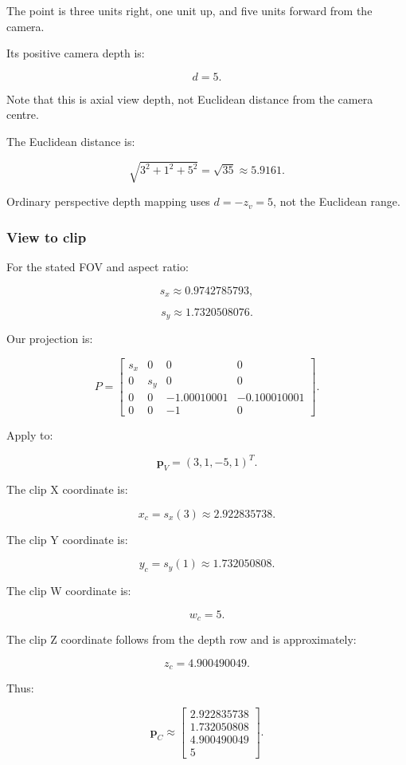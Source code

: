 The point is three units right, one unit up, and five units forward from the camera.

Its positive camera depth is:

\[
 \boxed{d=5}.
\]

Note that this is axial view depth, not Euclidean distance from the camera centre.

The Euclidean distance is:

\[
 \sqrt{3^2+1^2+5^2}=\sqrt{35}\approx5.9161.
\]

Ordinary perspective depth mapping uses \(d=-z_v=5\), not the Euclidean range.

\subsubsection{View to clip}\label{02-foundations-ii-ch037-view-to-clip}

\hypertarget{02-foundations-ii-ch037-view-to-clip}{}

For the stated FOV and aspect ratio:

\[
 s_x\approx0.9742785793,
\]

\[
 s_y\approx1.7320508076.
\]

Our projection is:

\[
 P= \begin{bmatrix} s_x&0&0&0\\ 0&s_y&0&0\\ 0&0&-1.00010001&-0.100010001\\ 0&0&-1&0 \end{bmatrix}.
\]

Apply to:

\[
 \mathbf p_V=(3,1,-5,1)^T.
\]

The clip X coordinate is:

\[
 x_c=s_x(3)\approx2.922835738.
\]

The clip Y coordinate is:

\[
 y_c=s_y(1)\approx1.732050808.
\]

The clip W coordinate is:

\[
 \boxed{w_c=5}.
\]

The clip Z coordinate follows from the depth row and is approximately:

\[
 z_c=4.900490049.
\]

Thus:

\[
 \boxed{ \mathbf p_C\approx \begin{bmatrix} 2.922835738\\ 1.732050808\\ 4.900490049\\ 5 \end{bmatrix} }.
\]

